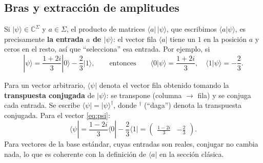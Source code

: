 \documentclass[11pt, a4paper, twoside, openright]{report}
\begin{document}
\subsection{Bras y extracción de amplitudes}

\noindent Si $|\psi\rangle \in \mathbb{C}^\Sigma$ y $a \in \Sigma$, el producto de matrices $\langle a|\,|\psi\rangle$, que escribimos $\langle a|\psi\rangle$, es precisamente \textbf{la entrada $a$ de $|\psi\rangle$}: el vector fila $\langle a|$ tiene un $1$ en la posición $a$ y ceros en el resto, así que ``selecciona'' esa entrada. Por ejemplo, si
\begin{equation}\label{eq:psi}
|\psi\rangle = \frac{1+2i}{3}|0\rangle - \frac23|1\rangle, \qquad \text{entonces} \qquad \langle 0|\psi\rangle = \frac{1+2i}{3}, \quad \langle 1|\psi\rangle = -\frac23.
\end{equation}

\noindent Para un vector arbitrario, $\langle \psi|$ denota el vector fila obtenido tomando la \textbf{transpuesta conjugada} de $|\psi\rangle$: se transpone (columna $\to$ fila) y se conjuga cada entrada. Se escribe $\langle\psi| = |\psi\rangle^\dagger$, donde $^\dagger$ (``daga'') denota la transpuesta conjugada. Para el vector \eqref{eq:psi}:
\[ \langle \psi| = \frac{1-2i}{3}\langle 0| - \frac23\langle 1| = \begin{pmatrix} \frac{1-2i}{3} & -\frac23 \end{pmatrix}. \]
Para vectores de la base estándar, cuyas entradas son reales, conjugar no cambia nada, lo que es coherente con la definición de $\langle a|$ en la sección clásica.
\end{document}
